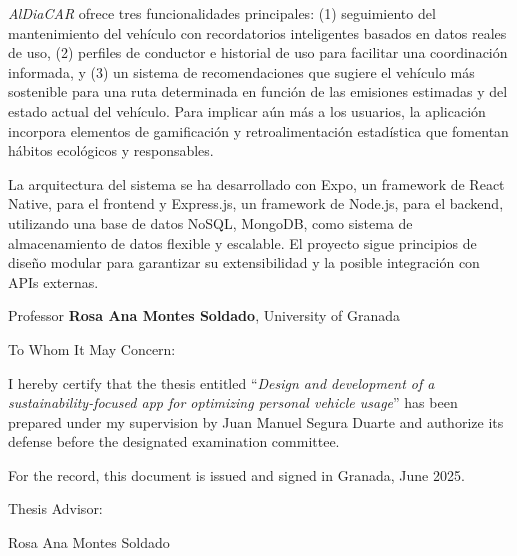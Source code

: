 \textgap

\textit{AlDiaCAR} ofrece tres funcionalidades principales: (1) seguimiento del mantenimiento del vehículo con recordatorios inteligentes basados en datos reales de uso, (2) perfiles de conductor e historial de uso para facilitar una coordinación informada, y (3) un sistema de recomendaciones que sugiere el vehículo más sostenible para una ruta determinada en función de las emisiones estimadas y del estado actual del vehículo. Para implicar aún más a los usuarios, la aplicación incorpora elementos de gamificación y retroalimentación estadística que fomentan hábitos ecológicos y responsables.

\textgap

La arquitectura del sistema se ha desarrollado con Expo, un framework de React Native, para el frontend y Express.js, un framework de Node.js, para el backend, utilizando una base de datos NoSQL, MongoDB, como sistema de almacenamiento de datos flexible y escalable. El proyecto sigue principios de diseño modular para garantizar su extensibilidad y la posible integración con APIs externas.

\textgap

\clearpage
\thispagestyle{empty}
\mbox{}
\newpage

\thispagestyle{empty}

\begin{flushleft}
    Professor \textbf{Rosa Ana Montes Soldado}, University of Granada
\end{flushleft}


\textgap

To Whom It May Concern:

\textgap

I hereby certify that the thesis entitled ``\textit{Design and development of a sustainability-focused app for optimizing personal vehicle usage}'' has been prepared under my supervision by Juan Manuel Segura Duarte and authorize its defense before the designated examination committee.

\textgap

For the record, this document is issued and signed in Granada, June 2025.

\vspace{1cm}

Thesis Advisor:

\vspace{5cm}

\noindent Rosa Ana Montes Soldado




